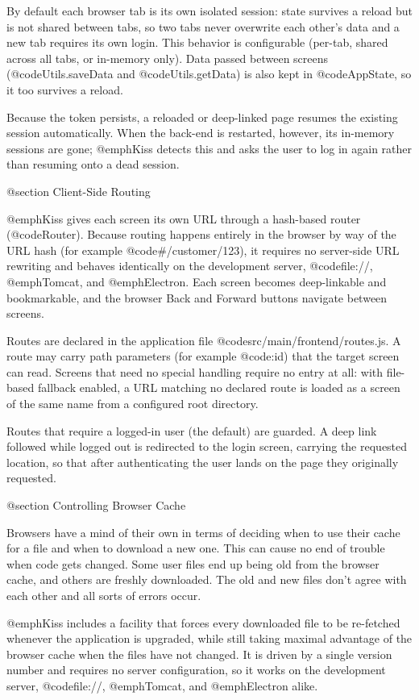 By default each browser tab is its own isolated session: state survives
a reload but is not shared between tabs, so two tabs never overwrite each
other's data and a new tab requires its own login.  This behavior is
configurable (per-tab, shared across all tabs, or in-memory only).  Data
passed between screens (@code{Utils.saveData} and @code{Utils.getData})
is also kept in @code{AppState}, so it too survives a reload.

Because the token persists, a reloaded or deep-linked page resumes the
existing session automatically.  When the back-end is restarted, however,
its in-memory sessions are gone; @emph{Kiss} detects this and asks the
user to log in again rather than resuming onto a dead session.

@section Client-Side Routing

@emph{Kiss} gives each screen its own URL through a hash-based router
(@code{Router}).  Because routing happens entirely in the browser by way
of the URL hash (for example @code{#/customer/123}), it requires no
server-side URL rewriting and behaves identically on the development
server, @code{file://}, @emph{Tomcat}, and @emph{Electron}.  Each screen
becomes deep-linkable and bookmarkable, and the browser Back and Forward
buttons navigate between screens.

Routes are declared in the application file
@code{src/main/frontend/routes.js}.  A route may carry path parameters
(for example @code{:id}) that the target screen can read.  Screens that
need no special handling require no entry at all: with file-based
fallback enabled, a URL matching no declared route is loaded as a screen
of the same name from a configured root directory.

Routes that require a logged-in user (the default) are guarded.  A deep
link followed while logged out is redirected to the login screen,
carrying the requested location, so that after authenticating the user
lands on the page they originally requested.

@section Controlling Browser Cache

Browsers have a mind of their own in terms of deciding when to use
their cache for a file and when to download a new one.  This can cause
no end of trouble when code gets changed.  Some user files end up
being old from the browser cache, and others are freshly downloaded.
The old and new files don't agree with each other and all sorts of
errors occur.

@emph{Kiss} includes a facility that forces every downloaded file to be
re-fetched whenever the application is upgraded, while still taking
maximal advantage of the browser cache when the files have not changed.
It is driven by a single version number and requires no server
configuration, so it works on the development server, @code{file://},
@emph{Tomcat}, and @emph{Electron} alike.

